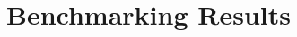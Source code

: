 \documentclass[lettersize,journal]{IEEEtran}
\begin{document}



\section{Benchmarking Results}
\label{section:results}
\end{document}
